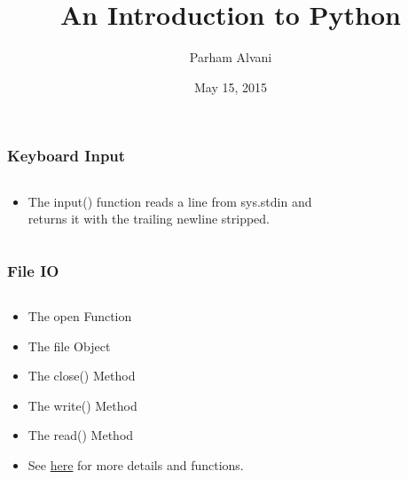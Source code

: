 \documentclass{beamer}
\title[Introduction]{An Introduction to Python}
\author{Parham Alvani}
\institute[AUT] {
  Amirkabir University of Technology \\
  \medskip
  {\small\tt parham.alvani@gmail.com}
}
\date{May 15, 2015}
\begin{document}
\begin{frame}
\titlepage
\end{frame}


\section{}
\subsection{}

\begin{frame}[fragile]
	\frametitle{Keyboard Input}
	\begin{columns}[c]
		\begin{column}{30cm}
			\vspace{.1cm}
			\begin{itemize}
				\item The input() function reads a line from sys.stdin and \\
				 returns it with the trailing newline stripped.
			\end{itemize}
		\end{column}
	\end{columns}
\end{frame}

\begin{frame}
	\frametitle{File IO}
	\begin{columns}[c]
		\begin{column}{30cm}
			\vspace{.1cm}
			\begin{itemize}
				\justifying
				\item The open Function
				\item The file Object
				\item The close() Method
				\item The write() Method
				\item The read() Method
				\item See
				\textcolor{blue}{\href{https://docs.python.org/2.4/lib/bltin-file-objects.html}{here}}
				for more details and functions.
			\end{itemize}
		\end{column}
	\end{columns}
\end{frame}
\end{document}
